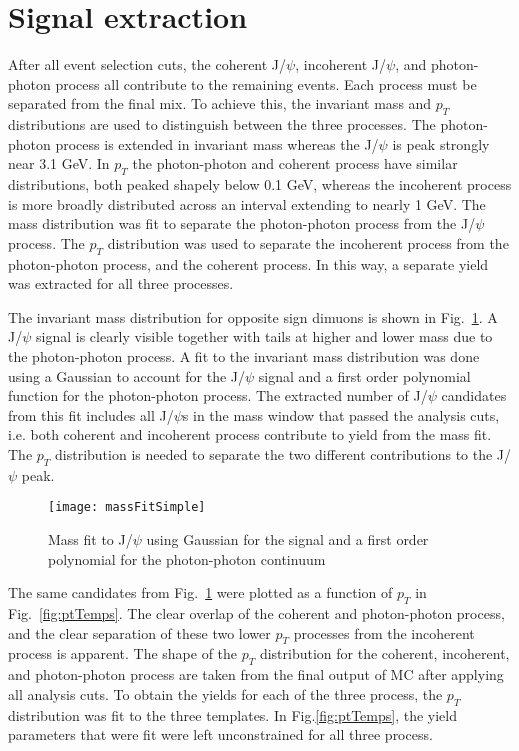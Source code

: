   \section{\label{sec:sigEx} Signal extraction}
    After all event selection cuts, the coherent J/$\psi$, incoherent J/$\psi$,
      and photon-photon process all contribute to the remaining events.
    Each process must be separated from the final mix.
    To achieve this, the invariant mass and $p_{T}$ distributions are used 
      to distinguish between the three processes. 
    The photon-photon process is extended in invariant mass whereas the 
      J/$\psi$ is peak strongly near 3.1 GeV.
    In $p_{T}$ the photon-photon and coherent process have similar 
      distributions, both peaked shapely below 0.1 GeV, whereas the incoherent 
      process is more broadly distributed across an interval extending to 
      nearly 1 GeV.
    The mass distribution was fit to separate the photon-photon process from
      the J/$\psi$ process.
    The $p_{T}$ distribution was used to separate the incoherent process from 
      the photon-photon process, and the coherent process. 
    In this way, a separate yield was extracted for all three processes. 

    The invariant mass distribution for opposite sign dimuons is shown in 
      Fig.~\ref{fig:massFit}. 
    A J/$\psi$ signal is clearly visible together with tails at higher and
      lower mass due to the photon-photon process.
    A fit to the invariant mass distribution was done using a Gaussian
      to account for the J/$\psi$ signal and a first order polynomial function 
      for the photon-photon process.
    The extracted number of J/$\psi$ candidates from this fit includes all 
      J/$\psi$s in the mass window that passed the analysis cuts, i.e. both
      coherent and incoherent process contribute to yield from the mass
      fit.
    The $p_{T}$ distribution is needed to separate the two different 
      contributions to the J/$\psi$ peak. 

    \begin{figure}[!Hhtb]
      \centering
      \texttt{[image: massFitSimple]}
      \caption{Mass fit to J/$\psi$ using Gaussian for the 
        signal and a first order polynomial for the photon-photon continuum}
      \label{fig:massFit}
    \end{figure}

    The same candidates from Fig.~\ref{fig:massFit} were plotted as a function
      of $p_{T}$ in Fig.~\ref{fig:ptTemps}.
    The clear overlap of the coherent and photon-photon process, and the 
      clear separation of these two lower $p_{T}$ processes from the incoherent
      process is apparent.
    The shape of the $p_{T}$ distribution for the coherent, incoherent, and 
      photon-photon process are taken from the final output of MC after
      applying all analysis cuts. 
    To obtain the yields for each of the three process, the $p_{T}$ 
      distribution was fit to the three templates.
    In Fig.\ref{fig:ptTemps}, the yield parameters that were fit were left
      unconstrained for all three process.

